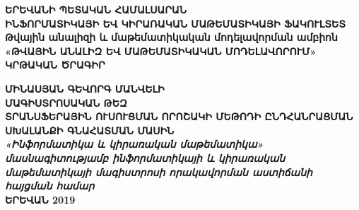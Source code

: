 \documentclass[12pt]{article}
\begin{document}
\newtheorem{theorem}{Թեորեմ}
\newtheorem{lemma}{Լեմմա}
\newtheorem{corollary}{Հետևանք}
\newtheorem{preposition}{Պնդում}
\newtheorem{defination}{Սահմանում}
\newtheorem{remark}{Դիտողություն}
\newtheorem*{remark*}{Դիտողություն}


\theoremstyle{definition} %
\newtheorem{innercustomcase}{Դեպք}
\newenvironment{customcase}[1]
  {\renewcommand\theinnercustomcase{#1}\innercustomcase}
  {\endinnercustomcase}
\newtheorem{case}{Դեպք}

\raggedbottom


\begin{titlepage}

\begin{center}
{\fontsize{18pt}{18pt} \selectfont \textbf{ԵՐԵՎԱՆԻ ՊԵՏԱԿԱՆ ՀԱՄԱԼՍԱՐԱՆ\\}} 
\vspace{7mm}
{\fontsize{18pt}{18pt} \selectfont \textbf{ԻՆՖՈՐՄԱՏԻԿԱՅԻ ԵՎ ԿԻՐԱՌԱԿԱՆ ՄԱԹԵՄԱՏԻԿԱՅԻ ՖԱԿՈՒԼՏԵՏ\\}}
\vspace{7mm}
{\fontsize{16pt}{16pt} \selectfont \textbf{ Թվային անալիզի և մաթեմատիկական մոդելավորման ամբիոն\\}}
\vspace{7mm}
{\fontsize{18pt}{18pt} \selectfont \textbf{ «ԹՎԱՅԻՆ ԱՆԱԼԻԶ ԵՎ ՄԱԹԵՄԱՏԻԿԱԿԱՆ ՄՈԴԵԼԱՎՈՐՈՒՄ»
ԿՐԹԱԿԱՆ ԾՐԱԳԻՐ\\}}

\vspace{25mm}
{\fontsize{18pt}{18pt} \selectfont \textbf{ՄԻՆԱՍՅԱՆ ԳԵՎՈՐԳ ՄԱՆՎԵԼԻ\\}}
\vspace{15mm}
{\fontsize{18pt}{18pt} \selectfont \textbf{ՄԱԳԻՍՏՐՈՍԱԿԱՆ ԹԵԶ\\}}
\vspace{5mm}
{\fontsize{16pt}{16pt} \selectfont \textbf{ՏՐԱՆՍՖԵՐԱՅԻՆ ՈՒՍՈՒՑՄԱՆ ՈՐՈՇԱԿԻ ՄԵԹՈԴԻ ԸՆԴՀԱՆՐԱՑՄԱՆ ՍԽԱԼԱՆՔԻ ԳՆԱՀԱՏՄԱՆ ՄԱՍԻՆ\\}}
\vspace{15mm}
{\fontsize{14pt}{14pt} \selectfont \textit{\textbf{«Ինֆորմատիկա և կիրառական մաթեմատիկա»  մասնագիտությամբ 
ինֆորմատիկայի և կիրառական մաթեմատիկայի մագիստրոսի որակավորման աստիճանի հայցման համար\\}}}
\vspace{30mm}
{\fontsize{13pt}{13pt} \selectfont \textbf{ ԵՐԵՎԱՆ 2019\\}}
\end{center}

\end{titlepage}
\end{document}
